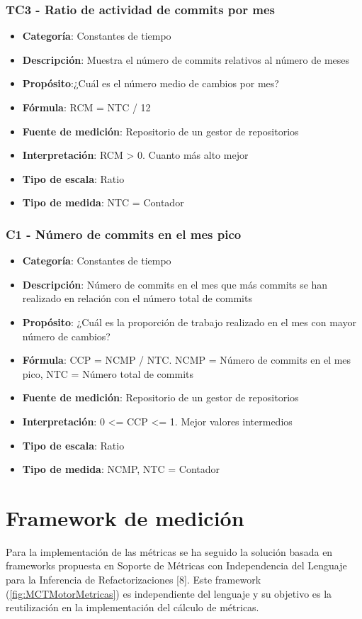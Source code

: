 \subsubsection{TC3 - Ratio de actividad de commits por mes}
\begin{itemize}
	\item \textbf{Categoría}: Constantes de tiempo
	\item \textbf{Descripción}: Muestra el número de commits relativos al número de meses
	\item \textbf{Propósito}:¿Cuál es el número medio de cambios por mes?
	\item \textbf{Fórmula}: RCM = NTC / 12
	\item \textbf{Fuente de medición}: Repositorio de un gestor de repositorios
	\item \textbf{Interpretación}: RCM > 0. Cuanto más alto mejor
	\item \textbf{Tipo de escala}: Ratio
	\item \textbf{Tipo de medida}: NTC = Contador
\end{itemize}
\subsubsection{C1 - Número de commits en el mes pico}
\begin{itemize}
	\item \textbf{Categoría}: Constantes de tiempo
	\item \textbf{Descripción}: Número de commits en el mes que más commits se han realizado en relación con el número total de commits
	\item \textbf{Propósito}: ¿Cuál es la proporción de trabajo realizado en el mes con mayor número de cambios?
	\item \textbf{Fórmula}: CCP = NCMP / NTC. NCMP = Número de commits en el mes pico, NTC = Número total de commits
	\item \textbf{Fuente de medición}: Repositorio de un gestor de repositorios
	\item \textbf{Interpretación}: 0 <= CCP <= 1. Mejor valores intermedios
	\item \textbf{Tipo de escala}: Ratio
	\item \textbf{Tipo de medida}: NCMP, NTC = Contador
\end{itemize}

\section{Framework de medición}
Para la implementación de las métricas se ha seguido la solución basada en frameworks propuesta en Soporte de Métricas con Independencia del Lenguaje para la Inferencia de Refactorizaciones [8]. Este framework (\ref{fig:MCTMotorMetricas}) es independiente del lenguaje y su objetivo es la reutilización en la implementación del cálculo de métricas.
